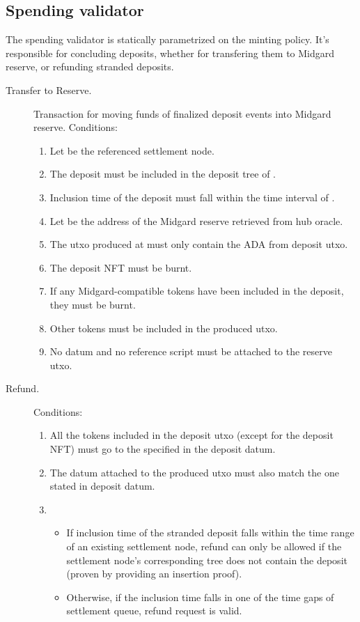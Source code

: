 \documentclass[../midgard.tex]{subfiles}
\begin{document}
\subsection{Spending validator}
\label{h:deposit-spending-validator}

The  spending validator is statically parametrized on the  minting policy.
It's responsible for concluding deposits, whether for transfering them to Midgard reserve, or refunding stranded deposits.

\begin{description}
  \item[Transfer to Reserve.] Transaction for moving funds of finalized deposit events into Midgard reserve.
    Conditions:
    \begin{enumerate}
      \item Let  be the referenced settlement node.
      \item The deposit must be included in the deposit tree of .
      \item Inclusion time of the deposit must fall within the time interval of .
      \item Let  be the address of the Midgard reserve retrieved from hub oracle.
      \item The utxo produced at  must only contain the ADA from deposit utxo.
      \item The deposit NFT must be burnt.
      \item If any Midgard-compatible tokens have been included in the deposit, they must be burnt.
      \item Other tokens must be included in the produced utxo.
      \item No datum and no reference script must be attached to the reserve utxo.
    \end{enumerate}
  \item[Refund.] 
    Conditions:
    \begin{enumerate}
      \item All the tokens included in the deposit utxo (except for the deposit NFT) must go to the  specified in the deposit datum.
      \item The datum attached to the produced utxo must also match the one stated in deposit datum.
      \item 
        \begin{itemize}
          \item If inclusion time of the stranded deposit falls within the time range of an existing settlement node, refund can only be allowed if the settlement node's corresponding tree does not contain the deposit (proven by providing an insertion proof).
          \item Otherwise, if the inclusion time falls in one of the time gaps of settlement queue, refund request is valid.
        \end{itemize}
    \end{enumerate}
\end{description}
\end{document}

